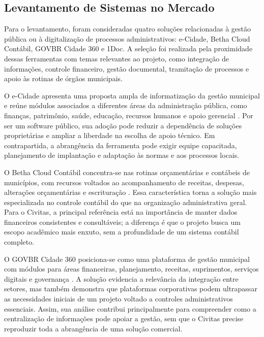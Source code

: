 \subsection{Levantamento de Sistemas no Mercado}

Para o levantamento, foram consideradas quatro soluções relacionadas à gestão pública ou à digitalização de processos administrativos: e-Cidade, Betha Cloud Contábil, GOVBR Cidade 360 e 1Doc. A seleção foi realizada pela proximidade dessas ferramentas com temas relevantes ao projeto, como integração de informações, controle financeiro, gestão documental, tramitação de processos e apoio às rotinas de órgãos municipais.

O e-Cidade apresenta uma proposta ampla de informatização da gestão municipal e reúne módulos associados a diferentes áreas da administração pública, como finanças, patrimônio, saúde, educação, recursos humanos e apoio gerencial \parencite{eCidadeSoftwarePublico2026}. Por ser um software público, sua adoção pode reduzir a dependência de soluções proprietárias e ampliar a liberdade na escolha de apoio técnico. Em contrapartida, a abrangência da ferramenta pode exigir equipe capacitada, planejamento de implantação e adaptação às normas e aos processos locais.

O Betha Cloud Contábil concentra-se nas rotinas orçamentárias e contábeis de municípios, com recursos voltados ao acompanhamento de receitas, despesas, alterações orçamentárias e escrituração \parencite{BethaContabilCloud2026}. Essa característica torna a solução mais especializada no controle contábil do que na organização administrativa geral. Para o Civitas, a principal referência está na importância de manter dados financeiros consistentes e consultáveis; a diferença é que o projeto busca um escopo acadêmico mais enxuto, sem a profundidade de um sistema contábil completo.

O GOVBR Cidade 360 posiciona-se como uma plataforma de gestão municipal com módulos para áreas financeiras, planejamento, receitas, suprimentos, serviços digitais e governança \parencite{GovbrCidade3602026}. A solução evidencia a relevância da integração entre setores, mas também demonstra que plataformas corporativas podem ultrapassar as necessidades iniciais de um projeto voltado a controles administrativos essenciais. Assim, sua análise contribui principalmente para compreender como a centralização de informações pode apoiar a gestão, sem que o Civitas precise reproduzir toda a abrangência de uma solução comercial.

